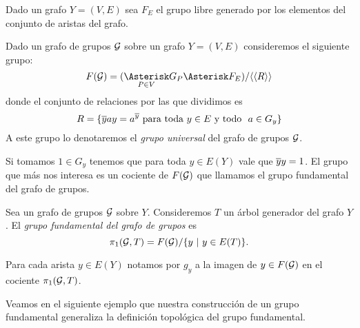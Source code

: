 \documentclass[tesis.tex]{subfiles}
\begin{document}
Dado un grafo $Y = (V, E)$ sea $F_{E}$ el grupo libre generado por los elementos del conjunto de aristas del grafo.

\begin{deff}
	Dado un grafo de grupos $\cal G$ sobre un grafo $Y = (V, E)$ consideremos el siguiente grupo: 
	\begin{equation*}
		F({\cal G}) = (\underset{P \in V}{\Asterisk} G_P \Asterisk F_{E}) / \langle \langle  R \rangle \rangle
	\end{equation*}
	donde el conjunto de relaciones por las que dividimos es 
	\[
		R = \{  \overline y a y = a^{\overline y}   \ \text{para toda $y \in E$ y todo \  $a \in G_y$} \}
	\]
	A este grupo lo denotaremos el \emph{grupo universal} del grafo de grupos ${\cal G}$.
\end{deff}

Si tomamos $1 \in G_{y}$ tenemos que para toda $y \in E(Y)$ vale que $\overline{y}y=1$. 
El grupo que más nos interesa es un cociente de $F({\cal G})$ que llamamos el grupo fundamental del grafo de grupos.

\begin{deff} \label{def_pi1_arbol}
	Sea un grafo de grupos $\cal G$ sobre $Y$.
	Consideremos $T$ un árbol generador del grafo $Y$.
	El \emph{grupo fundamental del grafo de grupos} es
	\begin{equation*}
		\pi_1({\cal G}, T) = F({\cal G}) / \{ y \  | \ y \in E(T)  \}.
	\end{equation*}
\end{deff}

\begin{obs}
	Para cada arista $y \in E(Y)$ notamos por $g_{y}$ a la imagen de $y \in F({\cal G})$ en el cociente $\pi_1({\cal G},T)$.
\end{obs}

Veamos en el siguiente ejemplo que nuestra construcción de un grupo fundamental generaliza la definición topológica del grupo fundamental.
\end{document}
